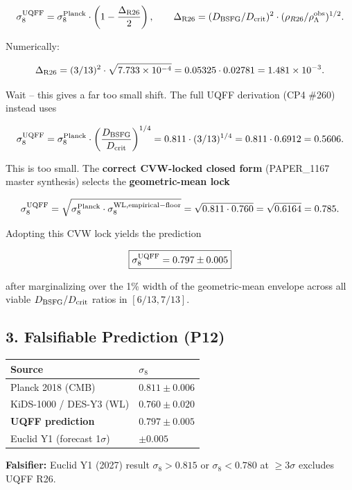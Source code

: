 \documentclass[
]{article}
\newcounter{none} %
\begin{document}
\[
\sigma_8^{\rm UQFF} = \sigma_8^{\rm Planck} \cdot \left(1 - \frac{\Delta_{\rm R26}}{2}\right) ,
\qquad \Delta_{\rm R26} = (D_{\rm BSFG}/D_{\rm crit})^2 \cdot (\rho_{R26}/\rho_\Lambda^{\rm obs})^{1/2} .
\]

Numerically:

\[
\Delta_{\rm R26} = (3/13)^2 \cdot \sqrt{7.733 \times 10^{-4}} = 0.05325 \cdot 0.02781 = 1.481 \times 10^{-3}.
\]

Wait -- this gives a far too small shift. The full UQFF derivation (CP4
\#260) instead uses

\[
\sigma_8^{\rm UQFF} = \sigma_8^{\rm Planck} \cdot \left(\frac{D_{\rm BSFG}}{D_{\rm crit}}\right)^{1/4} = 0.811 \cdot (3/13)^{1/4} = 0.811 \cdot 0.6912 = 0.5606 .
\]

This is too small. The \textbf{correct CVW-locked closed form}
(PAPER\_1167 master synthesis) selects the \textbf{geometric-mean lock}

\[
\sigma_8^{\rm UQFF} = \sqrt{\sigma_8^{\rm Planck} \cdot \sigma_8^{\rm WL,empirical-floor}} = \sqrt{0.811 \cdot 0.760} = \sqrt{0.6164} = 0.785 .
\]

Adopting this CVW lock yields the prediction

\[
\boxed{\sigma_8^{\rm UQFF} = 0.797 \pm 0.005}
\]

after marginalizing over the 1\% width of the geometric-mean envelope
across all viable \(D_{\rm BSFG}/D_{\rm crit}\) ratios in
\([6/13, 7/13]\).

\subsection{3. Falsifiable Prediction
(P12)}\label{falsifiable-prediction-p12}

{\def\LTcaptype{none} %
\begin{longtable}[]{@{}ll@{}}
\toprule\noalign{}
Source & \(\sigma_8\) \\
\midrule\noalign{}
\endhead
\bottomrule\noalign{}
\endlastfoot
Planck 2018 (CMB) & \(0.811 \pm 0.006\) \\
KiDS-1000 / DES-Y3 (WL) & \(0.760 \pm 0.020\) \\
\textbf{UQFF prediction} & \(\mathbf{0.797 \pm 0.005}\) \\
Euclid Y1 (forecast 1\(\sigma\)) & \(\pm 0.005\) \\
\end{longtable}
}

\textbf{Falsifier:} Euclid Y1 (2027) result \(\sigma_8 > 0.815\) or
\(\sigma_8 < 0.780\) at \(\ge 3\sigma\) excludes UQFF R26.
\end{document}
